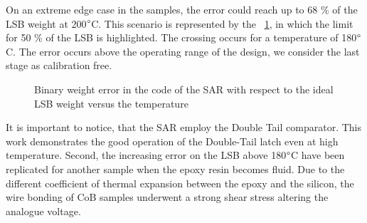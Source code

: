 On an extreme edge case in the samples, the error could reach up to 68 \% of the LSB weight at 200$\degree$C. This scenario is represented by the \figurename~\ref{fig:sar-test-coef_doe05_13}, in which the limit for 50 \% of the LSB is highlighted. The crossing occurs for a temperature of 180$\degree$C. The error occurs above the operating range of the design, we consider the last stage as calibration free.

\begin{figure}[htp]
    \centering
    
    \caption{Binary weight error in the code of the SAR with respect to the ideal LSB weight versus the temperature}
    \label{fig:sar-test-coef_doe05_13}
\end{figure}

It is important to notice, that the SAR employ the Double Tail comparator. This work demonstrates the good operation of the Double-Tail latch even at high temperature. Second, the increasing error on the LSB above 180$\degree$C have been replicated for another sample when the epoxy resin becomes fluid. Due to the different coefficient of thermal expansion between the epoxy and the silicon, the wire bonding of CoB samples underwent a strong shear stress altering the analogue voltage.
